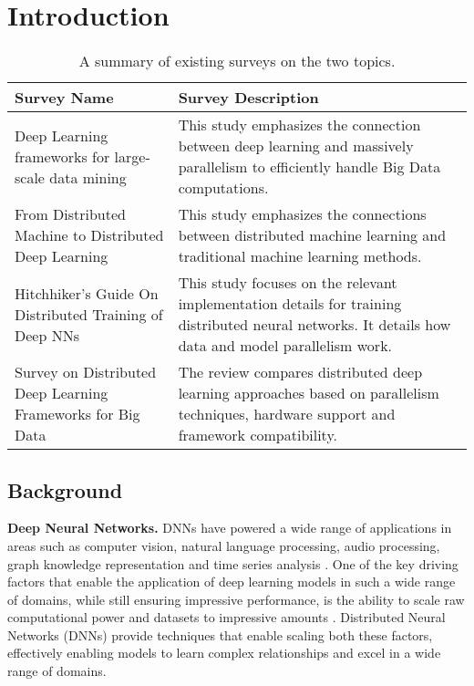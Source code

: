 \section{Introduction}
\label{sec:intro}

\begin{table*}[htbp]
	\centering
	\caption{A summary of existing surveys on the two topics.}
	\label{tab:related_surveys}
	\begin{tabular}{|p{5cm}|p{11cm}|}
		\toprule
		\textbf{Survey Name}                                                                                & \textbf{Survey Description}                                                                                                                         \\
		\midrule
		{\small Deep Learning frameworks for large-scale data mining~\cite{nguyen_machine_2019}}            & This study emphasizes the connection between deep learning and massively parallelism to efficiently handle Big Data computations.                   \\
		\midrule
		{\small From Distributed Machine to Distributed Deep Learning~\cite{dehghani_distributed_2023}}     & This study emphasizes the connections between distributed machine learning and traditional machine learning methods.                                \\
		\midrule
		{\small Hitchhiker’s Guide On Distributed Training of Deep NNs~\cite{chahal_hitchhikers_2018}}      & This study focuses on the relevant implementation details for training distributed neural networks. It details how data and model parallelism work. \\
		\midrule
		{\small Survey on Distributed Deep Learning Frameworks for Big Data~\cite{berloco_systematic_2022}} & The review compares distributed deep learning approaches based on parallelism techniques, hardware support and framework compatibility.             \\
		\bottomrule
	\end{tabular}
\end{table*}
\subsection{Background}

\textbf{Deep Neural Networks.}
DNNs have powered a wide range of applications in areas such as computer vision,
natural language processing, audio processing, graph knowledge representation and time series
analysis \cite{noauthor_papers_nodate}. One of the key driving factors that enable the application
of deep learning models in such a wide range of domains, while still ensuring impressive
performance, is the ability to scale raw computational power and datasets to impressive amounts
\cite{ben-nun_demystifying_2020, dehghani_distributed_2023, langer_distributed_2020}. Distributed
Neural Networks (DNNs) provide techniques that enable scaling both these factors, effectively
enabling models to learn complex relationships and excel in a wide range of domains.

